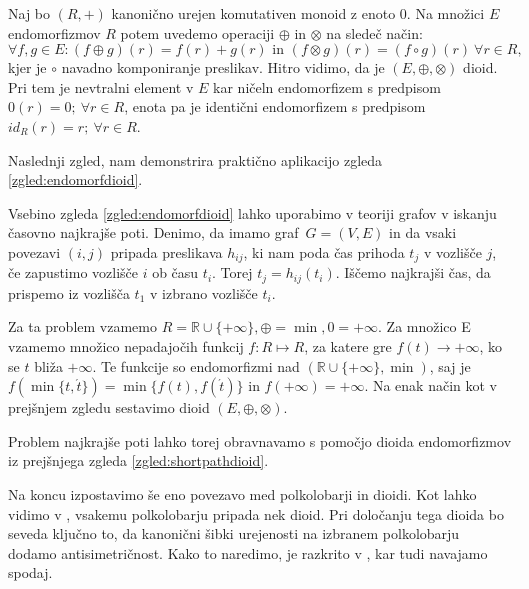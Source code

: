 \documentclass[mat1]{fmfdelo}
\newcommand{\R}{\mathbb{R}}
\begin{document}
\begin{zgled} \label{zgled:endomorfdioid}
	Naj bo $(R, +)$ kanonično urejen komutativen monoid z enoto $0$. Na množici $E$ endomorfizmov $R$ potem uvedemo operaciji $\oplus$ in $\otimes$ na sledeč način: $$\forall f, g \in E: (f\oplus g)(r) = f(r) + g(r) \text{~in~} (f\otimes g)(r) = (f \circ g)(r) ~\forall r\in R,$$ kjer je $\circ$ navadno komponiranje preslikav. Hitro vidimo, da je $(E, \oplus, \otimes)$ dioid.
	Pri tem je nevtralni element v $E$ kar ničeln endomorfizem s predpisom $0(r) = 0;~\forall r\in R$, enota pa je identični endomorfizem s predpisom $id_R(r) = r;~\forall r\in R$.
\end{zgled}

Naslednji zgled, nam demonstrira praktično aplikacijo zgleda \ref{zgled:endomorfdioid}.

\begin{zgled}\label{zgled:shortpathdioid}
	Vsebino zgleda \ref{zgled:endomorfdioid} lahko uporabimo v teoriji grafov v iskanju časovno najkrajše poti. Denimo, da imamo graf~$G = (V, E)$ in da vsaki povezavi $(i, j)$ pripada preslikava $h_{ij}$, ki nam poda čas prihoda $t_j$ v vozlišče $j$, če zapustimo vozlišče $i$ ob času $t_i$. Torej $ t_j = h_{ij}(t_i)$. Iščemo najkrajši čas, da prispemo iz vozlišča $t_1$ v izbrano vozlišče $t_i$.
	
	Za ta problem vzamemo $R = \R\cup\{+\infty\}, \oplus = \min, 0 = +\infty$. Za množico E vzamemo množico nepadajočih funkcij $f: R \mapsto R$, za katere gre $f(t) \to +\infty$, ko se $t$ bliža $+\infty$. Te funkcije so endomorfizmi nad $(\R\cup\{+\infty\}, \min)$, saj je $f(\min\{t, \acute{t}\}) = \min\{f(t),f(\acute{t})\}$ in $f(+\infty) = +\infty$. Na enak način kot v prejšnjem zgledu sestavimo dioid $(E, \oplus, \otimes)$.
\end{zgled}

Problem najkrajše poti lahko torej obravnavamo s pomočjo dioida endomorfizmov iz prejšnjega zgleda \ref{zgled:shortpathdioid}.

Na koncu izpostavimo še eno povezavo med polkolobarji in dioidi. Kot lahko vidimo v \cite[poglavje 6.\,9.\,]{bib:Gondran}, vsakemu polkolobarju pripada nek dioid. Pri določanju tega dioida bo seveda ključno to, da kanonični šibki urejenosti na izbranem polkolobarju dodamo antisimetričnost. Kako to naredimo, je razkrito v \cite[trditev 6.\,9.\,1.\,]{bib:Gondran}, kar tudi navajamo spodaj.
\end{document}
